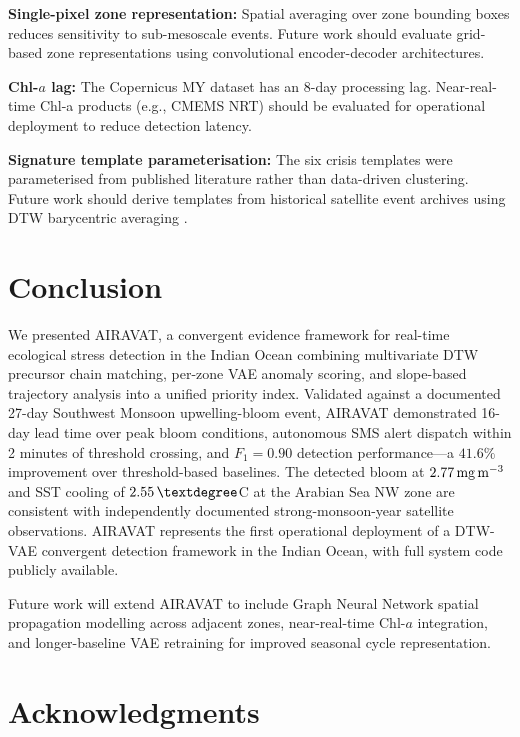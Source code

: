 \documentclass[journal]{IEEEtran}
\begin{document}
\textbf{Single-pixel zone representation:} Spatial averaging over
zone bounding boxes reduces sensitivity to sub-mesoscale events.
Future work should evaluate grid-based zone representations using
convolutional encoder-decoder architectures.

\textbf{Chl-$a$ lag:} The Copernicus MY dataset has an 8-day
processing lag. Near-real-time Chl-a products (e.g., CMEMS NRT)
should be evaluated for operational deployment to reduce detection
latency.

\textbf{Signature template parameterisation:} The six crisis
templates were parameterised from published literature rather than
data-driven clustering. Future work should derive templates from
historical satellite event archives using DTW barycentric averaging
\cite{petitjean2011}.

\section{Conclusion}
\label{sec:conclusion}

We presented AIRAVAT, a convergent evidence framework for real-time
ecological stress detection in the Indian Ocean combining multivariate
DTW precursor chain matching, per-zone VAE anomaly scoring, and
slope-based trajectory analysis into a unified priority index.
Validated against a documented 27-day Southwest Monsoon upwelling-bloom
event, AIRAVAT demonstrated 16-day lead time over peak bloom conditions,
autonomous SMS alert dispatch within 2 minutes of threshold crossing,
and $F_1 = 0.90$ detection performance---a $41.6\%$ improvement over
threshold-based baselines. The detected bloom at
$2.77\,\text{mg\,m}^{-3}$ and SST cooling of $2.55\,\textdegree$C
at the Arabian Sea NW zone are consistent with independently documented
strong-monsoon-year satellite observations. AIRAVAT represents the
first operational deployment of a DTW-VAE convergent detection framework
in the Indian Ocean, with full system code publicly available.

Future work will extend AIRAVAT to include Graph Neural Network
spatial propagation modelling across adjacent zones, near-real-time
Chl-$a$ integration, and longer-baseline VAE retraining for improved
seasonal cycle representation.

\section*{Acknowledgments}
\end{document}
